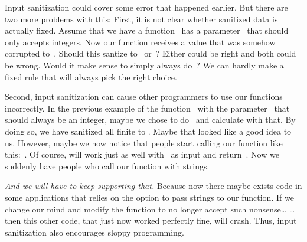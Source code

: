 Input sanitization could cover some error that happened earlier.
But there are two more problems with this:
First, it is not clear whether sanitized data is actually fixed.
Assume that we have a function~ has a parameter~ that should only accepts integers.
Now our function receives a value that was somehow corrupted to~.
Should this santize to~ or~?
Either could be right and both could be wrong.
Would it make sense to simply always do~?
We can hardly make a fixed rule that will always pick the right choice.

Second, input sanitization can cause other programmers to use our functions incorrectly.
In the previous example of the function~ with the parameter~ that should always be an integer, maybe we chose to do~ and calculate with that.
By doing so, we have sanitized all finite  to .
Maybe that looked like a good idea to us.
However, maybe we now notice that people start calling our function like this:~.
Of course,  will work just as well with~ as input and return~.
Now we suddenly have people who call our function  with strings.

\emph{And we will have to keep supporting that.}
Because now there maybe exists code in some applications that relies on the option to pass strings to our function.
If we change our mind and modify the function to no longer accept such nonsense{\dots}
{\dots}then this other code, that just now worked perfectly fine, will crash.
Thus, input sanitization also encourages sloppy programming.

